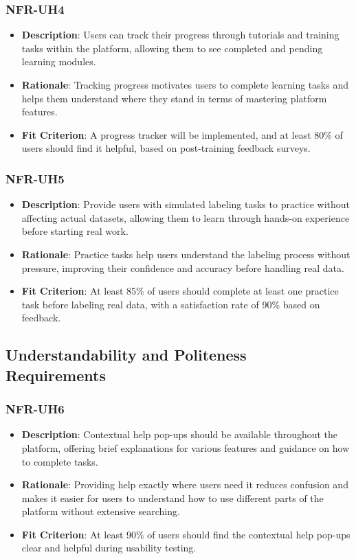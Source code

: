 \documentclass[12pt]{article}
\begin{document}
\subsubsection*{NFR-UH4} 
\label{sec:UH4}
        \begin{itemize} 
            \item \textbf{Description}: Users can track their progress through tutorials and training tasks within the platform, allowing them to see completed and pending learning modules.  
            \item \textbf{Rationale}: Tracking progress motivates users to complete learning tasks and helps them understand where they stand in terms of mastering platform features.  
            \item \textbf{Fit Criterion}: A progress tracker will be implemented, and at least 80\% of users should find it helpful, based on post-training feedback surveys.
        \end{itemize}
        \subsubsection*{NFR-UH5} 
        \label{sec:UH5}
        \begin{itemize} 
            \item \textbf{Description}: Provide users with simulated labeling tasks to practice without affecting actual datasets, allowing them to learn through hands-on experience before starting real work.  
            \item \textbf{Rationale}: Practice tasks help users understand the labeling process without pressure, improving their confidence and accuracy before handling real data.  
            \item \textbf{Fit Criterion}: At least 85\% of users should complete at least one practice task before labeling real data, with a satisfaction rate of 90\% based on feedback.
        \end{itemize}


\subsection{Understandability and Politeness Requirements}


\subsubsection*{NFR-UH6} 
\label{sec:UH6}
        \begin{itemize} 
            \item \textbf{Description}: Contextual help pop-ups should be available throughout the platform, offering brief explanations for various features and guidance on how to complete tasks.  
            \item \textbf{Rationale}: Providing help exactly where users need it reduces confusion and makes it easier for users to understand how to use different parts of the platform without extensive searching.  
            \item \textbf{Fit Criterion}: At least 90\% of users should find the contextual help pop-ups clear and helpful during usability testing.
        \end{itemize}
\end{document}
